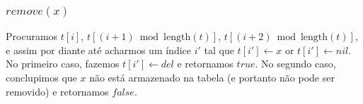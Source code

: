 \documentclass{beamer}
\begin{document}
\begin{frame}
\frametitle{$remove(x)$}
Procuramos \ensuremath{\ensuremath{t[i]}}, $t[(\ensuremath{\ensuremath{i}}+1)\bmod \ensuremath{\ensuremath{\mathrm{length}(t)}}]$, $t[(\ensuremath{\ensuremath{i}}+2)\bmod
\ensuremath{\ensuremath{\mathrm{length}(t)}}]$, e assim por diante até acharmos um índice \ensuremath{i'} tal que \ensuremath{\ensuremath{t[i']\gets x}}
or \ensuremath{\ensuremath{t[i']\gets \ensuremath{nil}}}.  No primeiro caso, fazemos \ensuremath{\ensuremath{t[i']\gets \ensuremath{del}}} e retornamos
\ensuremath{\ensuremath{\ensuremath{\mathit{true}}}}.  No segundo caso, conclupimos que \ensuremath{\ensuremath{x}} não está armazenado na tabela (e portanto não pode ser removido) e retornamos \ensuremath{\ensuremath{\ensuremath{\mathit{false}}}}.

\end{frame}
\end{document}
